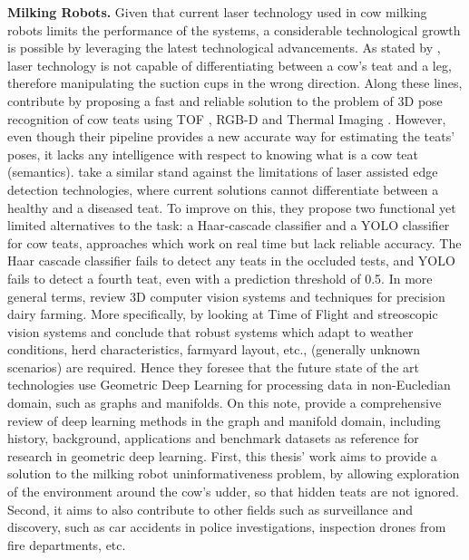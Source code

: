 \textbf{Milking Robots.}
Given that current laser technology used in cow milking robots limits the performance of the systems, a considerable technological growth is possible by leveraging the latest technological advancements. As stated by \textcite{pal2017algorithm}, laser technology is not capable of differentiating between a cow's teat and a leg, therefore manipulating the suction cups in the wrong direction. Along these lines, \citeauthor{pal2017algorithm} contribute by proposing a fast and reliable solution to the problem of 3D pose recognition of cow teats using TOF \cite{terabee2021tofprinciple}, RGB-D \cite{cruz2012kinect} and Thermal Imaging \cite{aaa2021thermalimaging}. However, even though their pipeline provides a new accurate way for estimating the teats' poses, it lacks any intelligence with respect to knowing what is a cow teat (semantics).
\textcite{rastogi2019teat} take a similar stand against the limitations of laser assisted edge detection technologies, where current solutions cannot differentiate between a healthy and a diseased teat. To improve on this, they propose two functional yet limited alternatives to the task: a Haar-cascade classifier and a YOLO classifier for cow teats, approaches which work on real time but lack reliable accuracy. The Haar cascade classifier fails to detect any teats in the occluded tests, and YOLO fails to detect a fourth teat, even with a prediction threshold of 0.5.
In more general terms, \textcite{o20193d} review 3D computer vision systems and techniques for precision dairy farming. More specifically, by looking at Time of Flight and streoscopic vision systems and conclude that robust systems which adapt to weather conditions, herd characteristics, farmyard layout, etc., (generally unknown scenarios) are required. Hence they foresee that the future state of the art technologies use Geometric Deep Learning for processing data in non-Eucledian domain, such as graphs and manifolds. On this note, \textcite{cao2020comprehensive} provide a comprehensive review of deep learning methods in the graph and manifold domain, including history, background, applications and benchmark datasets as reference for research in geometric deep learning. First, this thesis' work aims to provide a solution to the milking robot uninformativeness problem, by allowing exploration of the environment around the cow's udder, so that hidden teats are not ignored. Second, it aims to also contribute to other fields such as surveillance and discovery, such as car accidents in police investigations, inspection drones from fire departments, etc.  

